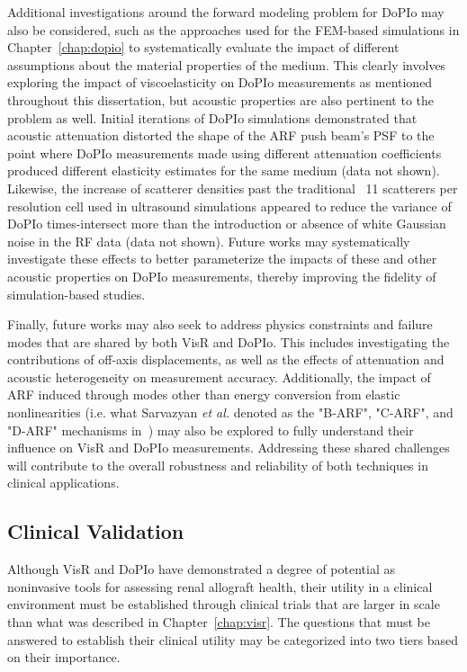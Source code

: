 Additional investigations around the forward modeling problem for DoPIo may also be considered, such as the approaches used for the FEM-based simulations in Chapter~\ref{chap:dopio} to systematically evaluate the impact of different assumptions about the material properties of the medium. This clearly involves exploring the impact of viscoelasticity on DoPIo measurements as mentioned throughout this dissertation, but acoustic properties are also pertinent to the problem as well. Initial iterations of DoPIo simulations demonstrated that acoustic attenuation distorted the shape of the ARF push beam's PSF to the point where DoPIo measurements made using different attenuation coefficients produced different elasticity estimates for the same medium (data not shown). Likewise, the increase of scatterer densities past the traditional~\cite{trahey_Properties_1988} 11 scatterers per resolution cell used in ultrasound simulations appeared to reduce the variance of DoPIo times-intersect more than the introduction or absence of white Gaussian noise in the RF data (data not shown). Future works may systematically investigate these effects to better parameterize the impacts of these and other acoustic properties on DoPIo measurements, thereby improving the fidelity of simulation-based studies.

%

Finally, future works may also seek to address physics constraints and failure modes that are shared by both VisR and DoPIo. This includes investigating the contributions of off-axis displacements, as well as the effects of attenuation and acoustic heterogeneity on measurement accuracy. Additionally, the impact of ARF induced through modes other than energy conversion from elastic nonlinearities (i.e. what Sarvazyan \emph{et al.} denoted as the "B-ARF", "C-ARF", and "D-ARF" mechanisms in~\cite{sarvazyan_Acoustic_2021}) may also be explored to fully understand their influence on VisR and DoPIo measurements. Addressing these shared challenges will contribute to the overall robustness and reliability of both techniques in clinical applications.

\subsection{Clinical Validation}

Although VisR and DoPIo have demonstrated a degree of potential as noninvasive tools for assessing renal allograft health, their utility in a clinical environment must be established through clinical trials that are larger in scale than what was described in Chapter~\ref{chap:visr}. The questions that must be answered to establish their clinical utility may be categorized into two tiers based on their importance.

